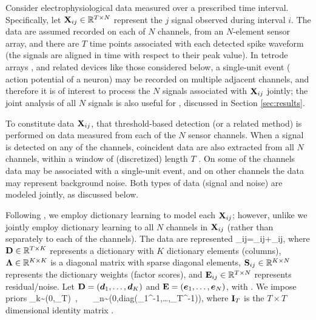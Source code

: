 \documentclass[journal]{IEEEtran}
\newcommand{\Real}{\mathbb{R}}
\begin{document}
Consider electrophysiological data measured over a prescribed time interval. Specifically, let ${\mathbf X}_{ij}\in\mathbb{R}^{T\times N}$ represent the $j$ signal observed during interval $i$. The data are assumed recorded on each of $N$ channels, from an $N$-element sensor array, and there are $T$ time points associated with each detected spike waveform (the signals are aligned in time with respect to their peak value). In tetrode arrays \cite{tetrode}, and related devices like those considered below, a single-unit event ( action potential of a neuron) may be recorded on multiple adjacent channels, and therefore it is of interest to process the $N$ signals associated with ${\mathbf X}_{ij}$ jointly; the joint analysis of all $N$ signals is also useful for , discussed in Section \ref{sec:results}.

To constitute data ${\mathbf X}_{ij}$,  that threshold-based detection (or a related method) is performed on data measured from each of the $N$ sensor channels. When a signal is detected on any of the channels, coincident data are also extracted from all $N$ channels, within a window of (discretized) length $T$ . On some of the channels data may be associated with a single-unit event, and on other channels the data may represent background noise. Both types of data (signal and noise) are modeled jointly, as discussed below.

Following \cite{Bo2011}, we employ dictionary learning to model each ${\mathbf X}_{ij}$; however, unlike \cite{Bo2011} we jointly employ dictionary learning to all $N$ channels in ${\mathbf X}_{ij}$ (rather than separately to each of the channels). The data are represented
\beq\Xmat_{ij}=\Dmat \Lambdamat \Smat_{ij}+\Emat_{ij},\label{eq:basic}\eeq
where ${\mathbf D}\in\mathbb{R}^{T\times K}$ represents a dictionary with $K$ dictionary elements (columns), $\boldsymbol{\Lambda}\in\mathbb{R}^{K\times K}$ is a diagonal matrix with sparse diagonal elements, ${\mathbf S}_{ij}\in\mathbb{R}^{K\times N}$ represents the dictionary weights (factor scores), and ${\mathbf E}_{ij}\in\mathbb{R}^{T\times N}$ represents residual/noise. Let ${\mathbf D}=(\boldsymbol{d}_1,\dots,\boldsymbol{d}_K)$ and ${\mathbf E}=(\boldsymbol{e}_1,\dots,\boldsymbol{e}_N)$, with . We impose  priors
\beq \dv_k\sim{}(0,\Imat_T)~,~~~ \ev_n\sim{}(0,\mbox{diag}(\eta_1^{-1},\dots,\eta_T^{-1})),\eeq
where ${\mathbf I}_T$ is the $T\times T$ dimensional identity matrix \add{and $\eta_t \in \Real$ for all $t$}.
\end{document}
